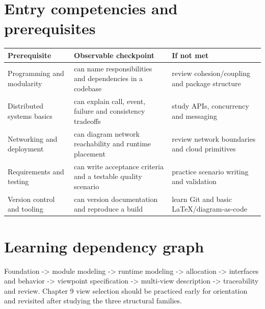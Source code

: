 \documentclass[10pt,letterpaper]{article}
\begin{document}
\DocProvenance
\section{Entry competencies and prerequisites}
\small
\begin{tabularx}{\linewidth}{@{}YYY@{}}
\toprule
\textbf{Prerequisite} & \textbf{Observable checkpoint} & \textbf{If not met} \\
\midrule
Programming and modularity & can name responsibilities and dependencies in a codebase & review cohesion/coupling and package structure \\
Distributed systems basics & can explain call, event, failure and consistency tradeoffs & study APIs, concurrency and messaging \\
Networking and deployment & can diagram network reachability and runtime placement & review network boundaries and cloud primitives \\
Requirements and testing & can write acceptance criteria and a testable quality scenario & practice scenario writing and validation \\
Version control and tooling & can version documentation and reproduce a build & learn Git and basic LaTeX/diagram-as-code \\
\bottomrule
\end{tabularx}
\normalsize
\section{Learning dependency graph}
Foundation -> module modeling -> runtime modeling -> allocation -> interfaces and behavior -> viewpoint specification -> multi-view description -> traceability and review. Chapter 9 view selection should be practiced early for orientation and revisited after studying the three structural families.
\end{document}
